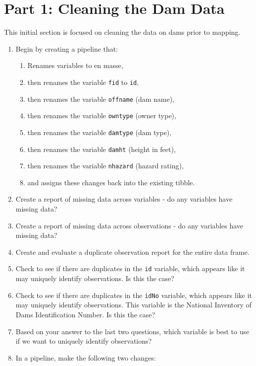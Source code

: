 \documentclass{tufte-handout}
\begin{document}
\newpage
\section{Part 1: Cleaning the Dam Data}
This initial section is focused on cleaning the data on dams prior to mapping.

\begin{enumerate}
\item Begin by creating a pipeline that:
\begin{enumerate}
\item Renames variables to en masse,
\item then renames the variable \texttt{fid} to \texttt{id},
\item then renames the variable \texttt{offname} (dam name),
\item then renames the variable \texttt{owntype} (owner type),
\item then renames the variable \texttt{damtype} (dam type),
\item then renames the variable \texttt{damht} (height in feet),
\item then renames the variable \texttt{nhazard} (hazard rating),
\item and assigns these changes back into the existing tibble.
\end{enumerate}
\item Create a report of missing data across variables - do any variables have missing data?
\item Create a report of missing data across observations - do any variables have missing data?
\item Create and evaluate a duplicate observation report for the entire data frame. 
\item Check to see if there are duplicates in the \texttt{id} variable, which appears like it may uniquely identify observations. Is this the case?
\item Check to see if there are duplicates in the \texttt{idNo} variable, which appears like it may uniquely identify observations. This variable is the National Inventory of Dams Identification Number. Is this the case?
\item Based on your answer to the last two questions, which variable is best to use if we want to uniquely identify observations?
\item In a pipeline, make the following two changes:

\end{enumerate}
\end{document}
